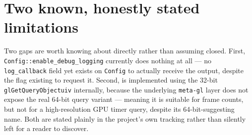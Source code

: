 \section{Two known, honestly stated limitations}

Two gaps are worth knowing about directly rather than assuming closed. First,
\texttt{Config::enable\_debug\_logging} currently does nothing at all --- no
\texttt{log\_callback} field yet exists on \texttt{Config} to actually receive the output,
despite the flag existing to request it. Second,  is
implemented using the 32-bit \texttt{glGetQueryObjectuiv} internally, because the underlying
\texttt{meta-gl} layer does not expose the real 64-bit query variant --- meaning it is
suitable for frame counts, but not for a high-resolution GPU timer query, despite its
64-bit-suggesting name. Both are stated plainly in the project's own tracking rather than
silently left for a reader to discover.
